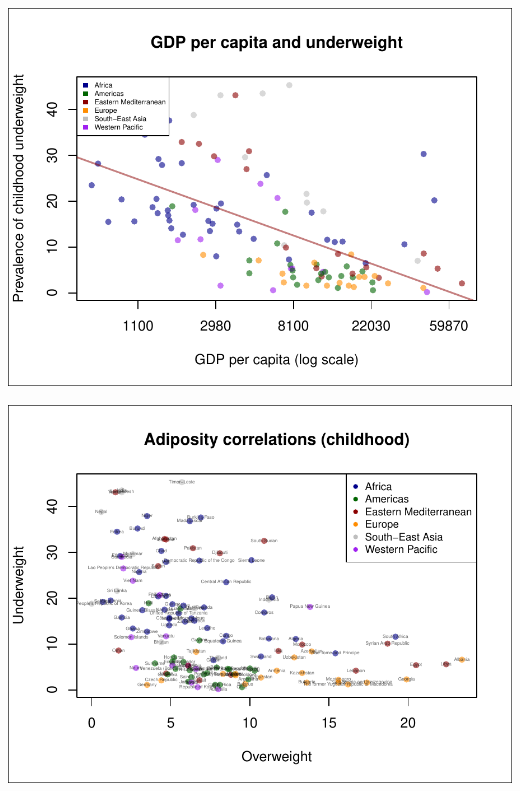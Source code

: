 \documentclass[11pt]{article}
\begin{document}
\begin{multicols}{2}
\begin{center}
\includegraphics{global_variance-010}
\end{center}
\vspace{2mm}




\begin{center}
\includegraphics{global_variance-011}
\end{center}




\end{multicols}
\newpage


\end{document}
